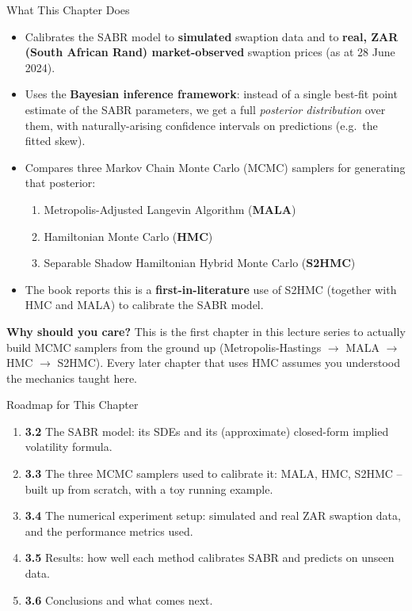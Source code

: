 \documentclass[aspectratio=169,10pt]{beamer}
\begin{document}
\begin{frame}{What This Chapter Does}
  \begin{itemize}
    \item Calibrates the SABR model to \textbf{simulated} swaption data and to
      \textbf{real, ZAR (South African Rand) market-observed} swaption prices
      (as at 28 June 2024).
    \item Uses the \textbf{Bayesian inference framework}: instead of a single
      best-fit point estimate of the SABR parameters, we get a full
      \emph{posterior distribution} over them, with naturally-arising
      confidence intervals on predictions (e.g.\ the fitted skew).
    \item Compares three Markov Chain Monte Carlo (MCMC) samplers for
      generating that posterior:
      \begin{enumerate}
        \item Metropolis-Adjusted Langevin Algorithm (\textbf{MALA})
        \item Hamiltonian Monte Carlo (\textbf{HMC})
        \item Separable Shadow Hamiltonian Hybrid Monte Carlo (\textbf{S2HMC})
      \end{enumerate}
    \item The book reports this is a \textbf{first-in-literature} use of
      S2HMC (together with HMC and MALA) to calibrate the SABR model.
  \end{itemize}

  \vspace{2mm}
  \textbf{Why should you care?} This is the first chapter in this lecture
  series to actually build MCMC samplers from the ground up (Metropolis-Hastings
  $\to$ MALA $\to$ HMC $\to$ S2HMC). Every later chapter that uses HMC assumes
  you understood the mechanics taught here.
\end{frame}

\begin{frame}{Roadmap for This Chapter}
  \begin{enumerate}
    \item \textbf{3.2} The SABR model: its SDEs and its (approximate)
      closed-form implied volatility formula.
    \item \textbf{3.3} The three MCMC samplers used to calibrate it:
      MALA, HMC, S2HMC -- built up from scratch, with a toy running example.
    \item \textbf{3.4} The numerical experiment setup: simulated and
      real ZAR swaption data, and the performance metrics used.
    \item \textbf{3.5} Results: how well each method calibrates SABR and
      predicts on unseen data.
    \item \textbf{3.6} Conclusions and what comes next.
  \end{enumerate}
\end{frame}
\end{document}
